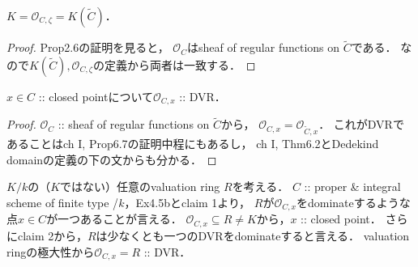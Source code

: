 \documentclass[a4paper]{jsarticle}
\newcommand{\shO}{\mathcal{O}}
\begin{document}
    \begin{Claim}[claim 1]
        $K=\shO_{C,\zeta}=K(\tilde{C})$．
    \end{Claim}
    \begin{proof}
        Prop2.6の証明を見ると，
        $\shO_C$はsheaf of regular functions on $\tilde{C}$である．
        なので$K(\tilde{C}), \shO_{C,\zeta}$の定義から両者は一致する．
    \end{proof}

    \begin{Claim}[claim 2]
        $x \in C$ :: closed pointについて$\shO_{C,x}$ :: DVR．
    \end{Claim}
    \begin{proof}
        $\shO_C$ :: sheaf of regular functions on $\tilde{C}$から，
        $\shO_{C,x}=\shO_{\tilde{C},x}$．
        これがDVRであることはch I, Prop6.7の証明中程にもあるし，
        ch I, Thm6.2とDedekind domainの定義の下の文からも分かる．
    \end{proof}

    $K/k$の（$K$ではない）任意のvaluation ring $R$を考える．
    $C$ :: proper \& integral scheme of finite type /$k$，Ex4.5bとclaim 1より，
    $R$が$\shO_{C,x}$をdominateするような点$x \in C$が一つあることが言える．
    $\shO_{C,x} \subseteq R \neq K$から，$x$ :: closed point．
    さらにclaim 2から，$R$は少なくとも一つのDVRをdominateすると言える．
    valuation ringの極大性から$\shO_{C,x}=R$ :: DVR．
\end{document}

